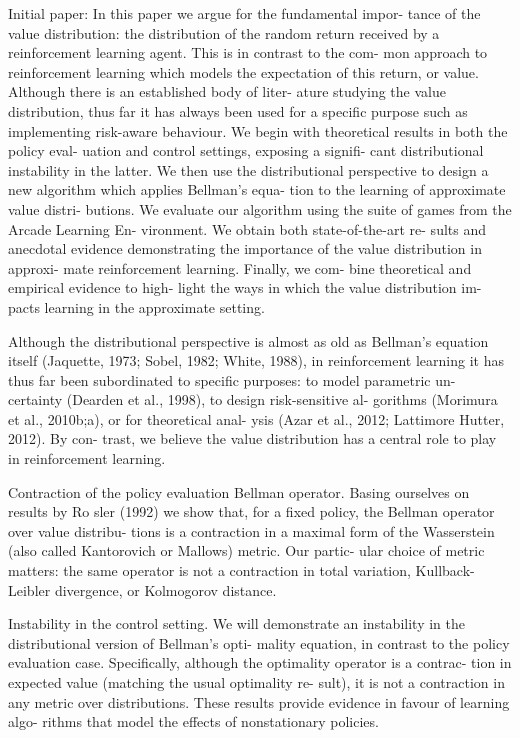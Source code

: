 \documentclass[12pt,a4paper,openright,twoside]{article}
\numberwithin{equation}{section}
\theoremstyle{definition}
\theoremstyle{remark}
\theoremstyle{plain}
\begin{document}
Initial paper\cite{DRL}:
In this paper we argue for the fundamental impor- tance of the value distribution: the distribution of the random return received by a reinforcement learning agent. This is in contrast to the com- mon approach to reinforcement learning which models the expectation of this return, or value. Although there is an established body of liter- ature studying the value distribution, thus far it has always been used for a specific purpose such as implementing risk-aware behaviour. We begin with theoretical results in both the policy eval- uation and control settings, exposing a signifi- cant distributional instability in the latter. We then use the distributional perspective to design a new algorithm which applies Bellman’s equa- tion to the learning of approximate value distri- butions. We evaluate our algorithm using the suite of games from the Arcade Learning En- vironment. We obtain both state-of-the-art re- sults and anecdotal evidence demonstrating the importance of the value distribution in approxi- mate reinforcement learning. Finally, we com- bine theoretical and empirical evidence to high- light the ways in which the value distribution im- pacts learning in the approximate setting.

Although the distributional perspective is almost as old as Bellman’s equation itself (Jaquette, 1973; Sobel, 1982; White, 1988), in reinforcement learning it has thus far been subordinated to specific purposes: to model parametric un- certainty (Dearden et al., 1998), to design risk-sensitive al- gorithms (Morimura et al., 2010b;a), or for theoretical anal- ysis (Azar et al., 2012; Lattimore  Hutter, 2012). By con- trast, we believe the value distribution has a central role to play in reinforcement learning.

Contraction of the policy evaluation Bellman operator. Basing ourselves on results by Ro sler (1992) we show that, for a fixed policy, the Bellman operator over value distribu- tions is a contraction in a maximal form of the Wasserstein (also called Kantorovich or Mallows) metric. Our partic- ular choice of metric matters: the same operator is not a contraction in total variation, Kullback-Leibler divergence, or Kolmogorov distance.

Instability in the control setting. We will demonstrate an instability in the distributional version of Bellman’s opti- mality equation, in contrast to the policy evaluation case. Specifically, although the optimality operator is a contrac- tion in expected value (matching the usual optimality re- sult), it is not a contraction in any metric over distributions. These results provide evidence in favour of learning algo- rithms that model the effects of nonstationary policies.
\end{document}

